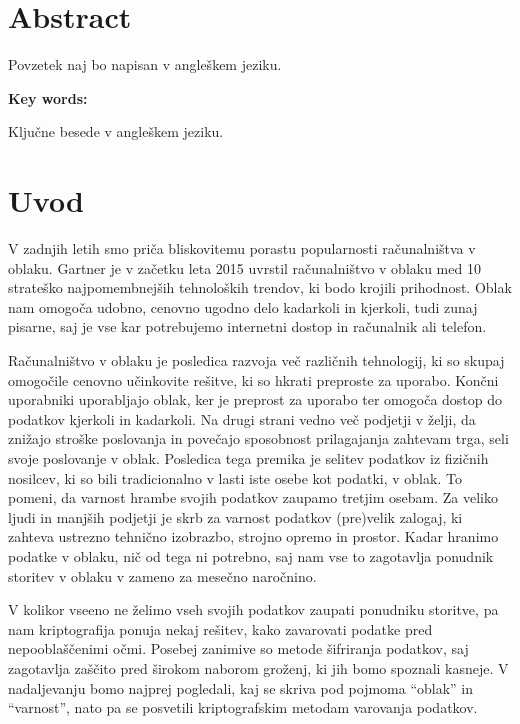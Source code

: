 \documentclass[12pt,a4paper,openany,tikz]{book}
\theoremstyle{plain}
\theoremstyle{definition}
\begin{document}
\chapter*{Abstract}


Povzetek naj bo napisan v angleškem jeziku.

\vspace{1.3cm}
\noindent
{\large \bf Key words:}

\vspace{0.5cm}
\noindent
Ključne besede v angleškem jeziku.


\setcounter{page}{1}
\chapter{Uvod}

V zadnjih letih smo priča bliskovitemu porastu popularnosti računalništva v oblaku. Gartner je v začetku leta 2015 uvrstil računalništvo v oblaku med 10 strateško najpomembnejših tehnoloških trendov, ki bodo krojili prihodnost. Oblak nam omogoča udobno, cenovno ugodno delo kadarkoli in kjerkoli, tudi zunaj pisarne, saj je vse kar potrebujemo internetni dostop in računalnik ali telefon.

Računalništvo v oblaku je posledica razvoja več različnih tehnologij, ki so skupaj omogočile cenovno učinkovite rešitve, ki so hkrati preproste za uporabo. Končni uporabniki uporabljajo oblak, ker je preprost za uporabo ter omogoča dostop do podatkov kjerkoli in kadarkoli. Na drugi strani vedno več podjetji v želji, da znižajo stroške poslovanja in povečajo sposobnost prilagajanja zahtevam trga, seli svoje poslovanje v oblak. Posledica tega premika je selitev podatkov iz fizičnih nosilcev, ki so bili tradicionalno v lasti iste osebe kot podatki, v oblak. To pomeni, da varnost hrambe svojih podatkov zaupamo tretjim osebam. Za veliko ljudi in manjših podjetji je skrb za varnost podatkov (pre)velik zalogaj, ki zahteva ustrezno tehnično izobrazbo, strojno opremo in prostor. Kadar hranimo podatke v oblaku, nič od tega ni potrebno, saj nam vse to zagotavlja ponudnik storitev v oblaku v zameno za mesečno naročnino.

V kolikor vseeno ne želimo vseh svojih podatkov zaupati ponudniku storitve, pa nam kriptografija ponuja nekaj rešitev, kako zavarovati podatke pred nepooblaščenimi očmi. Posebej zanimive so metode šifriranja podatkov, saj zagotavlja zaščito pred širokom naborom groženj, ki jih bomo spoznali kasneje.  V nadaljevanju bomo najprej pogledali, kaj se skriva pod pojmoma ``oblak'' in ``varnost'', nato pa se posvetili kriptografskim metodam varovanja podatkov.
\end{document}
